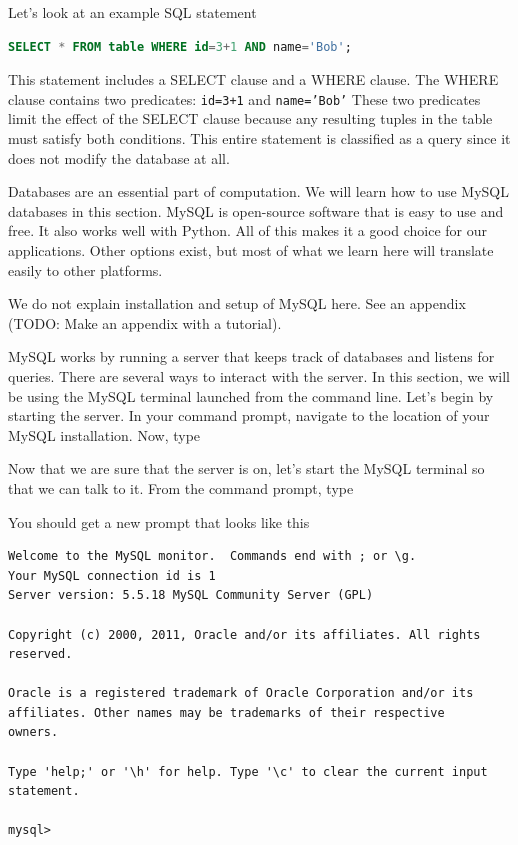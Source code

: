 Let's look at an example SQL statement
\begin{lstlisting}[language=SQL]
SELECT * FROM table WHERE id=3+1 AND name='Bob';
\end{lstlisting}
This statement includes a SELECT clause and a WHERE clause.
The WHERE clause contains two predicates: \texttt{id=3+1} and \texttt{name='Bob'}
These two predicates limit the effect of the SELECT clause because any resulting tuples in the table must satisfy both conditions.
This entire statement is classified as a query since it does not modify the database at all.



Databases are an essential part of computation.  We will learn how to use MySQL databases in this section.  MySQL is open-source software that is easy to use and free.  It also works well with Python.  All of this makes it a good choice for our applications.  Other options exist, but most of what we learn here will translate easily to other platforms.

We do not explain installation and setup of MySQL here.  See an appendix (TODO:  Make an appendix with a tutorial).

MySQL works by running a server that keeps track of databases and listens for queries.  There are several ways to interact with the server.  In this section, we will be using the MySQL terminal launched from the command line.  Let's begin by starting the server.  In your command prompt, navigate to the location of your MySQL installation. Now, type

Now that we are sure that the server is on, let's start the MySQL terminal so that we can talk to it.  From the command prompt, type


You should get a new prompt that looks like this

\begin{lstlisting}
Welcome to the MySQL monitor.  Commands end with ; or \g.
Your MySQL connection id is 1
Server version: 5.5.18 MySQL Community Server (GPL)

Copyright (c) 2000, 2011, Oracle and/or its affiliates. All rights reserved.

Oracle is a registered trademark of Oracle Corporation and/or its
affiliates. Other names may be trademarks of their respective
owners.

Type 'help;' or '\h' for help. Type '\c' to clear the current input statement.

mysql> 
\end{lstlisting}

